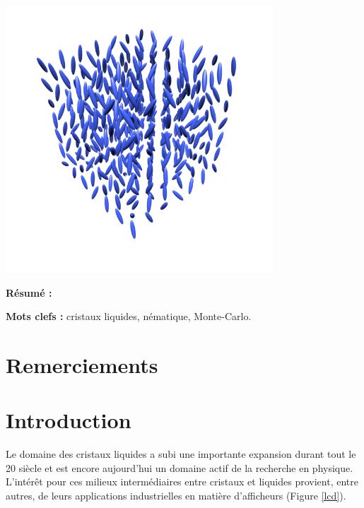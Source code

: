 \documentclass[11pt,a4paper]{article}
\numberwithin{equation}{section}
\begin{document}
\begin{titlepage}
\begin{center}
\includegraphics[height=10cm]{figures/cristaux_liquides.png} 
\end{center} 


\textbf{Résumé :} 
\vspace{0.3cm}

\textbf{Mots clefs :} cristaux liquides, nématique, Monte-Carlo.
\vspace{0.3cm}


\end{titlepage}

\newpage


\section*{Remerciements}




\tableofcontents


\newpage
\renewcommand\thepage{\arabic{page}}



\section*{Introduction}
Le domaine des cristaux liquides a subi une importante expansion durant tout le 20 siècle et est encore aujourd'hui un domaine actif de la recherche en physique. L'intérêt pour ces milieux intermédiaires entre cristaux et liquides provient, entre autres, de leurs applications industrielles en matière d'afficheurs (Figure \ref{lcd}).
\end{document}
